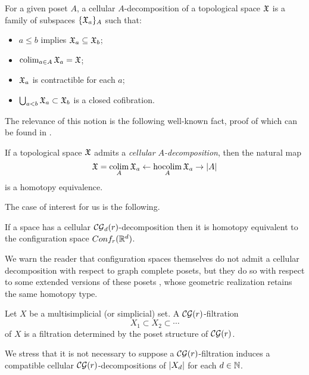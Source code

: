 \begin{definition}
	For a given poset $A$, a cellular $A$-decomposition of a topological space $\mathfrak{X}$ is a family of subspaces $\{\mathfrak{X}_a\}_A$ such that:
	\begin{itemize}
		\item $a \leq b$ implies $\mathfrak{X}_a \subseteq \mathfrak{X}_b$;
		\item $\operatorname*{colim}_{a \in A} \mathfrak{X}_a = \mathfrak{X}$;
		\item $\mathfrak{X}_a$ is contractible for each $a$;
		\item $\bigcup_{a<b} \mathfrak{X}_a \subset \mathfrak{X}_b$ is a closed cofibration.
	\end{itemize}
\end{definition}

The relevance of this notion is the following well-known fact, proof of which can be found in \cite[\S1.7]{berger1997confspacemodel}.

\begin{proposition}\label{p:cellular poset decomposition}
	If a topological space $\mathfrak{X}$ admits a \textit{cellular $A$-decomposition}, then the natural map
	\[
	\mathfrak{X} = \operatorname*{colim}_A \mathfrak{X}_a \leftarrow \operatorname*{hocolim}_A \mathfrak{X}_a \to \lvert A\rvert
	\]
	is a homotopy equivalence.
\end{proposition}

The case of interest for us is the following.

\begin{proposition}\label{p:berger}
	If a space has a cellular $\mathcal{CG}_d(r)$-decomposition then it is homotopy equivalent to
	the configuration space $Conf_{r}(\mathbb{R}^{d})$.
\end{proposition}

We warn the reader that configuration spaces themselves do not admit a cellular decomposition with respect to graph complete posets, but they do so with respect to some extended versions of these posets \cite{beuckelmann2021master}, whose geometric realization retains the same homotopy type.

\begin{definition}
	Let $X$ be a multisimplicial (or simplicial) set.
	A $\mathcal{CG}(r)$-filtration
	\[
	X_1 \subset X_2 \subset \dotsb
	\]
	of $X$ is a filtration determined by the poset structure of $\mathcal{CG}(r)$. 
\end{definition}

We stress that it is not necessary to suppose a $\mathcal{CG}(r)$-filtration induces a compatible cellular $\mathcal{CG}(r)$-decompositions of $\lvert X_d\rvert$ for each $d \in \mathbb{N}$.